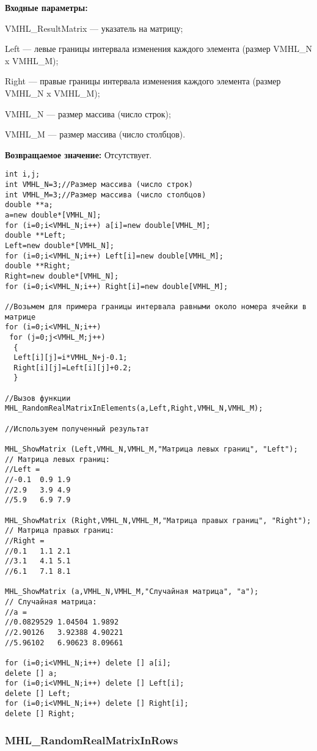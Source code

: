 \documentclass[a4paper,12pt]{article}
\begin{document}
\textbf{Входные параметры:}

 VMHL\_ResultMatrix --- указатель на матрицу;
 
Left --- левые границы интервала изменения каждого элемента (размер VMHL\_N x VMHL\_M);

 Right --- правые границы интервала изменения каждого элемента (размер VMHL\_N x VMHL\_M);
 
 VMHL\_N --- размер массива (число строк);
 
 VMHL\_M --- размер массива (число столбцов).

\textbf{Возвращаемое значение:}
Отсутствует.


\begin{lstlisting}[label=code_use_MHL_RandomRealMatrixInElements,caption=Пример использования]
int i,j;
int VMHL_N=3;//Размер массива (число строк)
int VMHL_M=3;//Размер массива (число столбцов)
double **a;
a=new double*[VMHL_N];
for (i=0;i<VMHL_N;i++) a[i]=new double[VMHL_M];
double **Left;
Left=new double*[VMHL_N];
for (i=0;i<VMHL_N;i++) Left[i]=new double[VMHL_M];
double **Right;
Right=new double*[VMHL_N];
for (i=0;i<VMHL_N;i++) Right[i]=new double[VMHL_M];

//Возьмем для примера границы интервала равными около номера ячейки в матрице
for (i=0;i<VMHL_N;i++)
 for (j=0;j<VMHL_M;j++)
  {
  Left[i][j]=i*VMHL_N+j-0.1;
  Right[i][j]=Left[i][j]+0.2;
  }

//Вызов функции
MHL_RandomRealMatrixInElements(a,Left,Right,VMHL_N,VMHL_M);

//Используем полученный результат

MHL_ShowMatrix (Left,VMHL_N,VMHL_M,"Матрица левых границ", "Left");
// Матрица левых границ:
//Left =
//-0.1	0.9	1.9
//2.9	3.9	4.9
//5.9	6.9	7.9

MHL_ShowMatrix (Right,VMHL_N,VMHL_M,"Матрица правых границ", "Right");
// Матрица правых границ:
//Right =
//0.1	1.1	2.1
//3.1	4.1	5.1
//6.1	7.1	8.1

MHL_ShowMatrix (a,VMHL_N,VMHL_M,"Случайная матрица", "a");
// Случайная матрица:
//a =
//0.0829529	1.04504	1.9892
//2.90126	3.92388	4.90221
//5.96102	6.90623	8.09661

for (i=0;i<VMHL_N;i++) delete [] a[i];
delete [] a;
for (i=0;i<VMHL_N;i++) delete [] Left[i];
delete [] Left;
for (i=0;i<VMHL_N;i++) delete [] Right[i];
delete [] Right;
\end{lstlisting}

\subsubsection{MHL\_RandomRealMatrixInRows}\label{MHL_RandomRealMatrixInRows}
\end{document}
